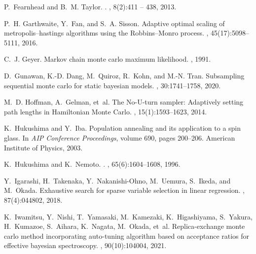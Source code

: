 \documentclass[12pt]{article}
\begin{document}
\begin{thebibliography}{10}
    P.~Fearnhead and B.~M. Taylor.
    .
    , 8(2):411 -- 438, 2013.
    
    P.~H. Garthwaite, Y.~Fan, and S.~A. Sisson.
    \newblock Adaptive optimal scaling of {metropolis}--{h}astings algorithms using
      the {R}obbins--{M}onro process.
    ,
      45(17):5098--5111, 2016.
    
    C.~J. Geyer.
    \newblock Markov chain monte carlo maximum likelihood.
    , 1991.
    
    D.~Gunawan, K.-D. Dang, M.~Quiroz, R.~Kohn, and M.-N. Tran.
    \newblock Subsampling sequential monte carlo for static bayesian models.
    , 30:1741--1758, 2020.
    
    M.~D. Hoffman, A.~Gelman, et~al.
    \newblock The {N}o-{U}-turn sampler: Adaptively setting path lengths in
      {H}amiltonian {M}onte {C}arlo.
    , 15(1):1593--1623, 2014.
    
    K.~Hukushima and Y.~Iba.
    \newblock Population annealing and its application to a spin glass.
    \newblock In {\em AIP Conference Proceedings}, volume 690, pages 200--206.
      American Institute of Physics, 2003.
    
    K.~Hukushima and K.~Nemoto.
    .
    , 65(6):1604--1608,
      1996.
    
    Y.~Igarashi, H.~Takenaka, Y.~Nakanishi-Ohno, M.~Uemura, S.~Ikeda, and M.~Okada.
    \newblock Exhaustive search for sparse variable selection in linear regression.
    , 87(4):044802, 2018.
    
    K.~Iwamitsu, Y.~Nishi, T.~Yamasaki, M.~Kamezaki, K.~Higashiyama, S.~Yakura,
      H.~Kumazoe, S.~Aihara, K.~Nagata, M.~Okada, et~al.
    \newblock Replica-exchange monte carlo method incorporating auto-tuning
      algorithm based on acceptance ratios for effective bayesian spectroscopy.
    , 90(10):104004, 2021.
    

\end{thebibliography}
\end{document}
